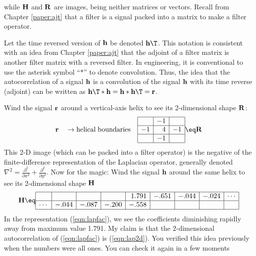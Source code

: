 while
$\bold H$ and $\bold R$ are images,
being neither matrices or vectors.
Recall from Chapter \ref{paper:ajt} that a filter is a signal
packed into a matrix to make a filter operator.
\par
Let the time reversed version of
$\bold h$
be denoted
$\bold h\T$.
This notation is consistent with an idea from
Chapter \ref{paper:ajt} that the adjoint of a filter matrix
is another filter matrix with a reversed filter.
In engineering, it is conventional to use the asterisk symbol
``$\ast$'' to denote convolution.
Thus, the idea that the autocorrelation of a 
signal $\bold h$
is a convolution of the
signal $\bold h$
with its time reverse (adjoint)
can be written as
$ {\bold h}\T \ast {\bold h} = {\bold h} \ast {\bold h}\T = {\bold r}$.
\par
Wind the signal $\bold r$ around a
vertical-axis helix to see its 2-dimensional shape $\bold R$:
\begin{equation}
\bold r
\quad
\rightarrow{\rm helical \; boundaries}
\quad
\begin{array}{|r|r|r|}  \hline
& -1 & \\
\hline
-1 & 4 & -1\\
\hline
& -1 & \\
\hline
\end{array}
\eq
\bold R
\label{eqn:lap2d}
\end{equation}
This 2-D image (which can be packed into a filter operator)
is the negative of the finite-difference representation
of the Laplacian operator, generally denoted
$\nabla^2 = \frac{\partial^2}{ \partial x^2} + \frac{\partial^2}{ \partial y^2} $.
Now for the magic:
Wind the signal $\bold h$ around the same helix
to see its 2-dimensional shape $\bold H$
\begin{equation}
\label{eqn:lapfac}
 {\bold H}
\eq
    \begin{array} {|r|r|r|r|r|r|r|r|r|} \hline
             &      &       &       & 1.791 &  -.651 & -.044  & -.024& \cdots \\
	     \hline 
      \cdots &-.044 & -.087 & -.200 & -.558 &        &        &      &
     \\ \hline
    \end{array}
\end{equation}
In the representation (\ref{eqn:lapfac}), we see the coefficients diminishing
rapidly away from maximum value 1.791.
My claim is that the 2-dimensional autocorrelation of (\ref{eqn:lapfac})
is (\ref{eqn:lap2d}).
You verified this idea previously when the numbers were all ones.
You can check it again in a few moments
